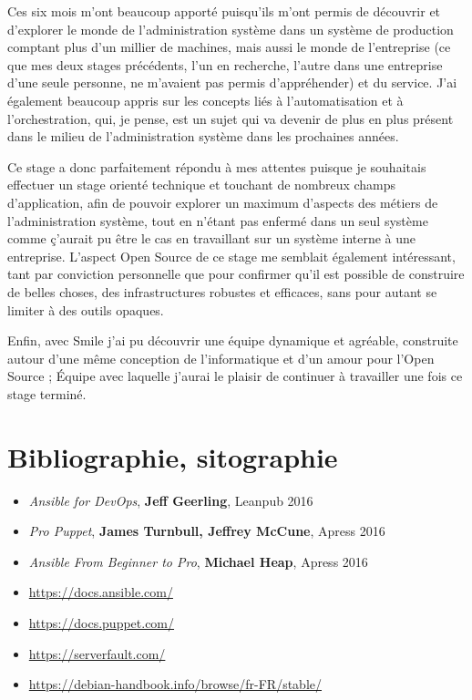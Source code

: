 \documentclass[14 pt,a4paper]{extreport}
\begin{document}
Ces six mois m'ont beaucoup apporté puisqu'ils m'ont permis de découvrir et d'explorer le monde de l'administration système dans un système de production comptant plus d'un millier de machines, mais aussi le monde de l'entreprise (ce que mes deux stages précédents, l'un en recherche, l'autre dans une entreprise d'une seule personne, ne m'avaient pas permis d'appréhender) et du service. J'ai également beaucoup appris sur les concepts liés à l'automatisation et à l'orchestration, qui, je pense, est un sujet qui va devenir de plus en plus présent dans le milieu de l'administration système dans les prochaines années.

Ce stage a donc parfaitement répondu à mes attentes puisque je souhaitais effectuer un stage orienté technique et touchant de nombreux champs d'application, afin de pouvoir explorer un maximum d'aspects des métiers de l'administration système, tout en n'étant pas enfermé dans un seul système comme ç'aurait pu être le cas en travaillant sur un système interne à une entreprise. L'aspect Open Source de ce stage me semblait également intéressant, tant par conviction personnelle que pour confirmer qu'il est possible de construire de belles choses, des infrastructures robustes et efficaces, sans pour autant se limiter à des outils opaques.

Enfin, avec Smile j'ai pu découvrir une équipe dynamique et agréable, construite autour d'une même conception de l'informatique et d'un amour pour l'Open Source ; Équipe avec laquelle j'aurai le plaisir de continuer à travailler une fois ce stage terminé.

\chapter{Bibliographie, sitographie}

\begin{itemize}
	\item \emph{Ansible for DevOps}, \textbf{Jeff Geerling}, Leanpub 2016
	\item \emph{Pro Puppet}, \textbf{James Turnbull, Jeffrey McCune}, Apress 2016 
	\item \emph{Ansible From Beginner to Pro}, \textbf{Michael Heap}, Apress 2016
	\item \url{https://docs.ansible.com/}
	\item \url{https://docs.puppet.com/}
	\item \url{https://serverfault.com/}
	\item \url{https://debian-handbook.info/browse/fr-FR/stable/}
\end{itemize}
\end{document}

